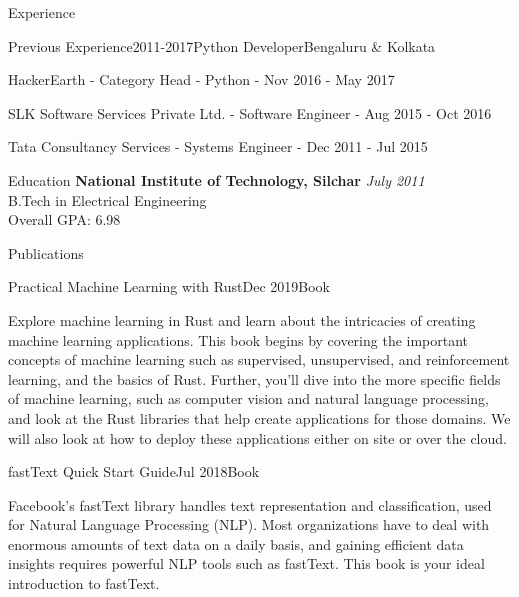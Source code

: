 \documentclass{resume}
\begin{document}
\begin{rSection}{Experience}
    \begin{rSubsection}{Previous Experience}{2011-2017}{Python Developer}{Bengaluru \& Kolkata}
    \item HackerEarth - Category Head - Python - Nov 2016 - May 2017
    \item SLK Software Services Private Ltd. - Software Engineer - Aug 2015 - Oct 2016
    \item Tata Consultancy Services - Systems Engineer - Dec 2011 - Jul 2015
    \end{rSubsection}
  
  \end{rSection}
  
  \begin{rSection}{Education}
    {\bf National Institute of Technology, Silchar} \hfill {\em July 2011} \\ 
    { B.Tech in Electrical Engineering } \\
    Overall GPA: 6.98
  \end{rSection}
  
  \begin{rSection}{Publications}

    \begin{rSubsection}{Practical Machine Learning with Rust}{Dec 2019}{Book}
    \item Explore machine learning in Rust and learn about the intricacies of creating machine learning applications. This book begins by covering the important concepts of machine learning such as supervised, unsupervised, and reinforcement learning, and the basics of Rust. Further, you’ll dive into the more specific fields of machine learning, such as computer vision and natural language processing, and look at the Rust libraries that help create applications for those domains. We will also look at how to deploy these applications either on site or over the cloud.
    \end{rSubsection}
    
    \begin{rSubsection}{fastText Quick Start Guide}{Jul 2018}{Book}
    \item Facebook's fastText library handles text representation and classification, used for Natural Language Processing (NLP). Most organizations have to deal with enormous amounts of text data on a daily basis, and gaining efficient data insights requires powerful NLP tools such as fastText. This book is your ideal introduction to fastText.
    \end{rSubsection}
    
  \end{rSection}
  
\end{document}
